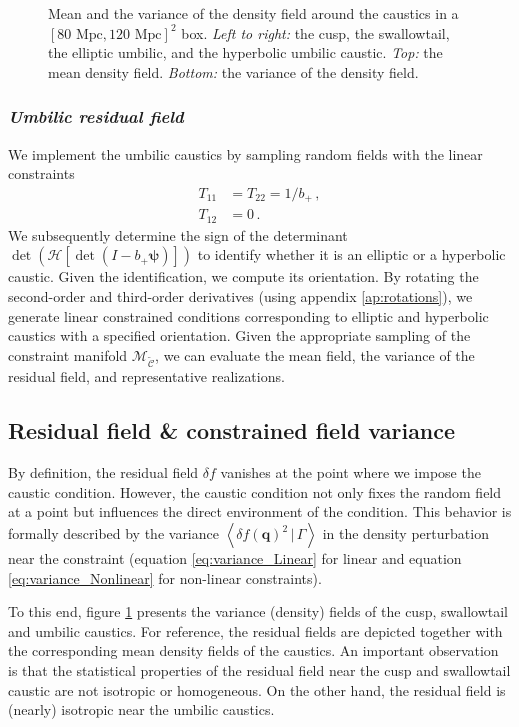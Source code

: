 \documentclass[a4paper, 11pt]{article}
\begin{document}
\begin{figure}
\begin{subfigure}[b]{0.24\textwidth}
\end{subfigure}
\caption{Mean and the variance of the density field around the caustics in a $[80\text{ Mpc},120 \text{ Mpc}]^2$ box. \textit{Left to right:} the cusp, the swallowtail, the elliptic umbilic, and the hyperbolic umbilic caustic. \textit{Top:} the mean density field. \textit{Bottom:} the variance of the density field.}\label{fig:mean_var_dens}
\end{figure}

\subsubsection{{\it Umbilic residual field}}
We implement the umbilic caustics by sampling random fields with the linear constraints
\begin{align}
T_{11}&=T_{22}=1/b_+\,,\\
T_{12}&=0\,.
\end{align}
We subsequently determine the sign of the determinant $\det\left( \mathcal{H}\left[\det (I- b_+ \bm{\psi})\right]\right)$ to identify whether it is an elliptic or a hyperbolic caustic. Given the identification, we compute its orientation. By rotating the second-order and third-order derivatives (using appendix \ref{ap:rotations}), we generate linear constrained conditions corresponding to elliptic and hyperbolic caustics with a specified orientation. Given the appropriate sampling of the constraint manifold $\mathcal{M}_\mathcal{\tilde C}$, we can evaluate the mean field, the variance of the residual field, and representative realizations.

\subsection{Residual field \& constrained field variance}
By definition, the residual field $\delta f$ vanishes at the point where we impose the caustic condition. However, the caustic condition not only fixes the random field at a point but influences the direct environment of the condition. This behavior is formally described by the variance $\left \langle \delta f (\bm{q})^2\,|\,\Gamma\right\rangle$ in the density perturbation near the constraint (equation \eqref{eq:variance_Linear} for linear and equation \eqref{eq:variance_Nonlinear} for non-linear constraints).

To this end, figure \ref{fig:mean_var_dens} presents the variance (density) fields of the cusp, swallowtail and umbilic caustics.
For reference, the residual fields are depicted together with the corresponding mean density fields of the caustics. An important observation is that the statistical properties of the residual field near the cusp and swallowtail caustic are not isotropic or homogeneous. On the other hand, the residual field is (nearly) isotropic near the umbilic caustics.
\end{document}
